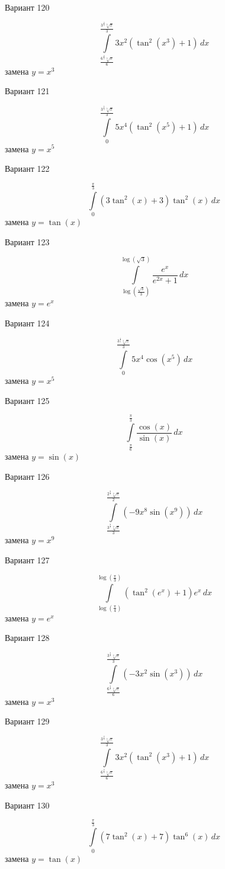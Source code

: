 \documentclass[11pt]{report}
\begin{document}
Вариант 120

$$\int\limits_{\frac{6^{\frac{2}{3}} \sqrt[3]{\pi}}{6}}^{\frac{3^{\frac{2}{3}} \sqrt[3]{\pi}}{3}} 3 x^{2} \left(\tan^{2}{\left(x^{3} \right)} + 1\right)\, dx$$
замена $y = x^{3}$

Вариант 121

$$\int\limits_{0}^{\frac{3^{\frac{4}{5}} \sqrt[5]{\pi}}{3}} 5 x^{4} \left(\tan^{2}{\left(x^{5} \right)} + 1\right)\, dx$$
замена $y = x^{5}$

Вариант 122

$$\int\limits_{0}^{\frac{\pi}{3}} \left(3 \tan^{2}{\left(x \right)} + 3\right) \tan^{2}{\left(x \right)}\, dx$$
замена $y = \tan{\left(x \right)}$

Вариант 123

$$\int\limits_{\log{\left(\frac{\sqrt{3}}{3} \right)}}^{\log{\left(\sqrt{3} \right)}} \frac{e^{x}}{e^{2 x} + 1}\, dx$$
замена $y = e^{x}$

Вариант 124

$$\int\limits_{0}^{\frac{3^{\frac{4}{5}} \sqrt[5]{\pi}}{3}} 5 x^{4} \cos{\left(x^{5} \right)}\, dx$$
замена $y = x^{5}$

Вариант 125

$$\int\limits_{\frac{\pi}{6}}^{\frac{\pi}{3}} \frac{\cos{\left(x \right)}}{\sin{\left(x \right)}}\, dx$$
замена $y = \sin{\left(x \right)}$

Вариант 126

$$\int\limits_{\frac{3^{\frac{8}{9}} \sqrt[9]{\pi}}{3}}^{\frac{2^{\frac{8}{9}} \sqrt[9]{\pi}}{2}} \left(- 9 x^{8} \sin{\left(x^{9} \right)}\right)\, dx$$
замена $y = x^{9}$

Вариант 127

$$\int\limits_{\log{\left(\frac{\pi}{4} \right)}}^{\log{\left(\frac{\pi}{3} \right)}} \left(\tan^{2}{\left(e^{x} \right)} + 1\right) e^{x}\, dx$$
замена $y = e^{x}$

Вариант 128

$$\int\limits_{\frac{6^{\frac{2}{3}} \sqrt[3]{\pi}}{6}}^{\frac{3^{\frac{2}{3}} \sqrt[3]{\pi}}{3}} \left(- 3 x^{2} \sin{\left(x^{3} \right)}\right)\, dx$$
замена $y = x^{3}$

Вариант 129

$$\int\limits_{\frac{6^{\frac{2}{3}} \sqrt[3]{\pi}}{6}}^{\frac{3^{\frac{2}{3}} \sqrt[3]{\pi}}{3}} 3 x^{2} \left(\tan^{2}{\left(x^{3} \right)} + 1\right)\, dx$$
замена $y = x^{3}$

Вариант 130

$$\int\limits_{0}^{\frac{\pi}{3}} \left(7 \tan^{2}{\left(x \right)} + 7\right) \tan^{6}{\left(x \right)}\, dx$$
замена $y = \tan{\left(x \right)}$
\end{document}
